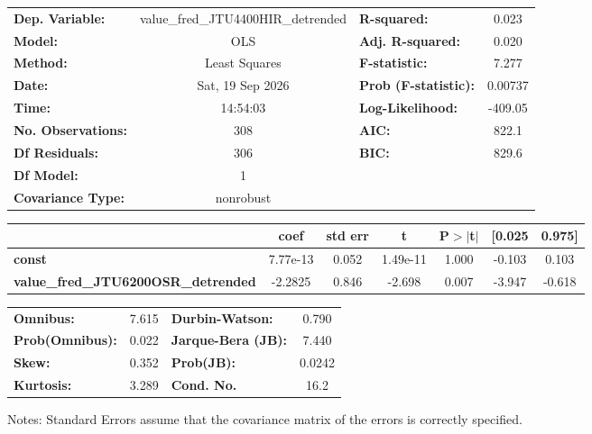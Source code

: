 \begin{center}
\begin{tabular}{lclc}
\toprule
\textbf{Dep. Variable:}                     & value\_fred\_JTU4400HIR\_detrended & \textbf{  R-squared:         } &     0.023   \\
\textbf{Model:}                             &                OLS                 & \textbf{  Adj. R-squared:    } &     0.020   \\
\textbf{Method:}                            &           Least Squares            & \textbf{  F-statistic:       } &     7.277   \\
\textbf{Date:}                              &          Sat, 19 Sep 2026          & \textbf{  Prob (F-statistic):} &  0.00737    \\
\textbf{Time:}                              &              14:54:03              & \textbf{  Log-Likelihood:    } &   -409.05   \\
\textbf{No. Observations:}                  &                  308               & \textbf{  AIC:               } &     822.1   \\
\textbf{Df Residuals:}                      &                  306               & \textbf{  BIC:               } &     829.6   \\
\textbf{Df Model:}                          &                    1               & \textbf{                     } &             \\
\textbf{Covariance Type:}                   &             nonrobust              & \textbf{                     } &             \\
\bottomrule
\end{tabular}
\begin{tabular}{lcccccc}
                                            & \textbf{coef} & \textbf{std err} & \textbf{t} & \textbf{P$> |$t$|$} & \textbf{[0.025} & \textbf{0.975]}  \\
\midrule
\textbf{const}                              &     7.77e-13  &        0.052     &  1.49e-11  &         1.000        &       -0.103    &        0.103     \\
\textbf{value\_fred\_JTU6200OSR\_detrended} &      -2.2825  &        0.846     &    -2.698  &         0.007        &       -3.947    &       -0.618     \\
\bottomrule
\end{tabular}
\begin{tabular}{lclc}
\textbf{Omnibus:}       &  7.615 & \textbf{  Durbin-Watson:     } &    0.790  \\
\textbf{Prob(Omnibus):} &  0.022 & \textbf{  Jarque-Bera (JB):  } &    7.440  \\
\textbf{Skew:}          &  0.352 & \textbf{  Prob(JB):          } &   0.0242  \\
\textbf{Kurtosis:}      &  3.289 & \textbf{  Cond. No.          } &     16.2  \\
\bottomrule
\end{tabular}
\end{center}

Notes: \newline
 [1] Standard Errors assume that the covariance matrix of the errors is correctly specified.